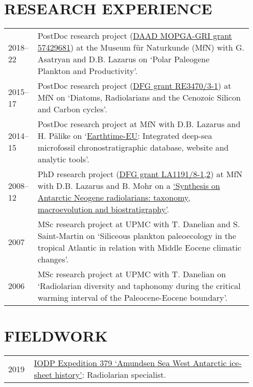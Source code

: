 \documentclass[11pt, a4paper]{article}
\begin{document}
\section{RESEARCH EXPERIENCE}
\begin{longtable}{p{0.1\linewidth} P{0.85\linewidth}}
2018--22 & PostDoc research project (\href{https://www.daad.de/medien/hochschulen/regional/europa/mopga/projektbeschreibungen_englisch_15-05-2018.pdf}{DAAD MOPGA-GRI grant 57429681}) at the Museum f\"{u}r Naturkunde (MfN) with G. Asatryan and D.B. Lazarus on `Polar Paleogene Plankton and Productivity'.\\
2015--17 & PostDoc research project (\href{http://gepris.dfg.de/gepris/projekt/279867559}{DFG grant RE3470/3-1}) at MfN on `Diatoms, Radiolarians and the Cenozoic Silicon and Carbon cycles'.\\
2014--15 & PostDoc research project at MfN with D.B. Lazarus and H. P\"{a}like on `\href{http://earthtime-eu.eu/earthtime/?page_id=686}{Earthtime-EU}: Integrated deep-sea microfossil chronostratigraphic database, website and analytic tools'.\\
2008--12 & PhD research project (\href{http://gepris.dfg.de/gepris/projekt/84744046}{DFG grant LA1191/8-1,2}) at MfN with D.B. Lazarus and B. Mohr on a \href{https://doi.org/10.18452/16985}{`Synthesis on Antarctic Neogene radiolarians: taxonomy, macroevolution and biostratigraphy'}.\\
2007 & MSc research project at UPMC with T. Danelian and S. Saint-Martin on `Siliceous plankton paleoecology in the tropical Atlantic in relation with Middle Eocene climatic changes'.\\
2006 & MSc research project at UPMC with T. Danelian on `Radiolarian diversity and taphonomy during the critical warming interval of the Paleocene-Eocene boundary'.\\
\end{longtable}

\section{FIELDWORK}
\begin{longtable}{p{0.1\linewidth} P{0.85\linewidth}}
2019 & \href{https://iodp.tamu.edu/scienceops/expeditions/amundsen_sea_ice_sheet_history.html}{IODP Expedition 379 `Amundsen Sea West Antarctic ice-sheet history'}: Radiolarian specialist.\\
\end{longtable}
\end{document}
